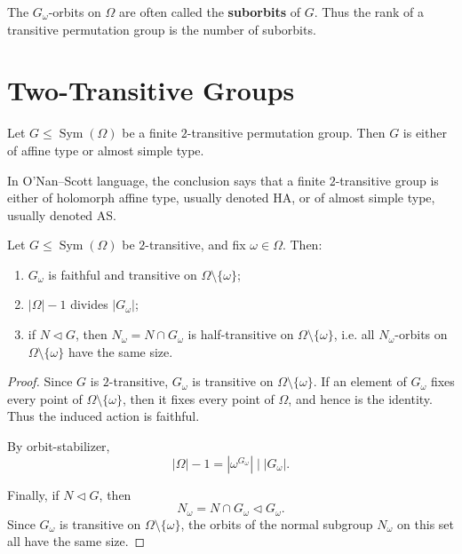 \begin{remark}
The \(G_\omega\)-orbits on \(\Omega\) are often called the \textbf{suborbits} of
\(G\). Thus the rank of a transitive permutation group is the number of suborbits.
\end{remark}

\section{Two-Transitive Groups}

\begin{theorem}[Burnside]
Let \(G \leq \operatorname{Sym}(\Omega)\) be a finite \(2\)-transitive permutation
group. Then \(G\) is either of affine type or almost simple type.
\end{theorem}

\begin{remark}
In O'Nan--Scott language, the conclusion says that a finite \(2\)-transitive group
is either of holomorph affine type, usually denoted HA, or of almost simple type,
usually denoted AS.
\end{remark}

\begin{proposition}
Let \(G \leq \operatorname{Sym}(\Omega)\) be \(2\)-transitive, and fix
\(\omega \in \Omega\). Then:
\begin{enumerate}[label=\textup{(\roman*)}]
    \item \(G_\omega\) is faithful and transitive on
    \(\Omega \setminus \{\omega\}\);
    \item \(|\Omega|-1\) divides \(|G_\omega|\);
    \item if \(N \lhd G\), then \(N_\omega=N\cap G_\omega\) is half-transitive on
    \(\Omega \setminus \{\omega\}\), i.e. all \(N_\omega\)-orbits on
    \(\Omega \setminus \{\omega\}\) have the same size.
\end{enumerate}
\end{proposition}

\begin{proof}
Since \(G\) is \(2\)-transitive, \(G_\omega\) is transitive on
\(\Omega \setminus \{\omega\}\). If an element of \(G_\omega\) fixes every point
of \(\Omega \setminus \{\omega\}\), then it fixes every point of \(\Omega\), and
hence is the identity. Thus the induced action is faithful.

By orbit-stabilizer,
\[
|\Omega|-1
=
|\omega^{G_\omega}|
\mid |G_\omega|.
\]

Finally, if \(N \lhd G\), then
\[
N_\omega=N\cap G_\omega \lhd G_\omega.
\]
Since \(G_\omega\) is transitive on \(\Omega \setminus \{\omega\}\), the orbits of
the normal subgroup \(N_\omega\) on this set all have the same size.
\end{proof}

